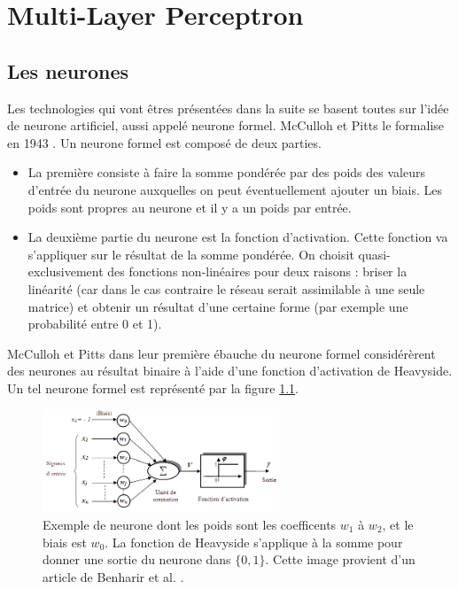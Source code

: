 \chapter{Multi-Layer Perceptron}

\section{Les neurones}

Les technologies qui vont êtres présentées dans la suite se basent toutes sur l'idée de neurone artificiel, aussi appelé neurone formel. McCulloh et Pitts le formalise en 1943 \cite{mcculloch_logical_1943}.
Un neurone formel est composé de deux parties.\begin{itemize}
\item La première consiste à faire la somme pondérée par des poids des valeurs d'entrée du neurone auxquelles on peut éventuellement ajouter un biais. Les poids sont propres au neurone et il y a un poids par entrée.
\item La deuxième partie du neurone est la fonction d'activation. Cette fonction va s'appliquer sur le résultat de la somme pondérée. On choisit quasi-exclusivement des fonctions non-linéaires pour deux raisons : briser la linéarité (car dans le cas contraire le réseau serait assimilable à une seule matrice) et obtenir un résultat d'une certaine forme (par exemple une probabilité entre 0 et 1).
\end{itemize}
McCulloh et Pitts dans leur première ébauche du neurone formel considérèrent des neurones au résultat binaire à l'aide d'une fonction d'activation de Heavyside. Un tel neurone formel est représenté par la figure \ref{neurone_exemple}.



\begin{figure}[!h]
\centering
\includegraphics[width=200pt,valign=t]{"images/MLP/neurone_exemple2"}
\caption{Exemple de neurone dont les poids sont les coefficents $w_1$ à $w_2$, et le biais est $w_0$. La fonction de Heavyside s'applique à la somme pour donner une sortie du neurone dans $\{0, 1\}$. Cette image provient d'un article de Benharir et al. \cite{benharir_approche_2014}.}
\label{neurone_exemple}
\end{figure}

